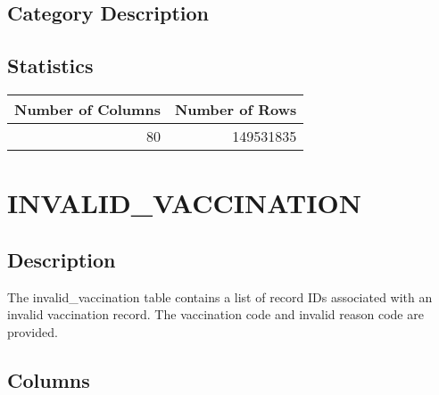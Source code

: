 \documentclass[
  letterpaper,
  DIV=11,
  numbers=noendperiod]{scrreprt}
\begin{document}
\hypertarget{category-description-13}{%
\section*{Category Description}\label{category-description-13}}

\hypertarget{statistics-13}{%
\section*{Statistics}\label{statistics-13}}

\begin{longtable}{rr}
\toprule
Number of Columns & Number of Rows \\ 
\midrule
80 & 149531835 \\ 
\bottomrule
\end{longtable}

\hypertarget{invalid_vaccination}{%
\chapter*{INVALID\_VACCINATION}\label{invalid_vaccination}}

\hypertarget{description-14}{%
\section*{Description}\label{description-14}}

The invalid\_vaccination table contains a list of record IDs associated
with an invalid vaccination record. The vaccination code and invalid
reason code are provided.

\hypertarget{columns-14}{%
\section*{Columns}\label{columns-14}}
\end{document}
